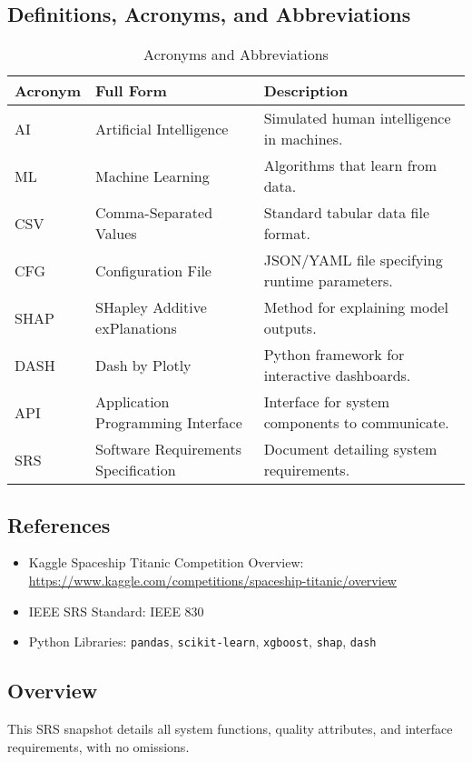 \documentclass[15pt]{article}
\begin{document}
\subsection{Definitions, Acronyms, and Abbreviations}
\begin{table}[h!]
  \centering
  \begin{tabular}{|l|l|p{8cm}|}
  \hline
  \textbf{Acronym} & \textbf{Full Form}                   & \textbf{Description} \\
  \hline
  AI       & Artificial Intelligence              & Simulated human intelligence in machines. \\
  ML       & Machine Learning                     & Algorithms that learn from data. \\
  CSV      & Comma-Separated Values               & Standard tabular data file format. \\
  CFG      & Configuration File                   & JSON/YAML file specifying runtime parameters. \\
  SHAP     & SHapley Additive exPlanations        & Method for explaining model outputs. \\
  DASH     & Dash by Plotly                       & Python framework for interactive dashboards. \\
  API      & Application Programming Interface    & Interface for system components to communicate. \\
  SRS      & Software Requirements Specification  & Document detailing system requirements. \\
  \hline
  \end{tabular}
  \caption{Acronyms and Abbreviations}
\end{table}

\subsection{References}
\begin{itemize}
  \item Kaggle Spaceship Titanic Competition Overview: \url{https://www.kaggle.com/competitions/spaceship-titanic/overview}
  \item IEEE SRS Standard: IEEE 830
  \item Python Libraries: \texttt{pandas}, \texttt{scikit-learn}, \texttt{xgboost}, \texttt{shap}, \texttt{dash}
\end{itemize}

\subsection{Overview}
This SRS snapshot details all system functions, quality attributes, and interface requirements, with no omissions.
\end{document}
